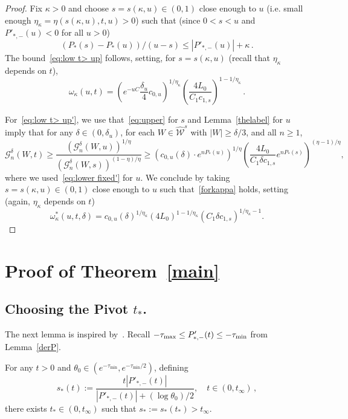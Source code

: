 \documentclass[AHL,Unicode,longabstracts,published]{cedram}
\newcommand{\cG}{\mathcal{G}}
\newcommand{\cW}{\mathcal{W}}
\newcommand{\hW}{\widehat{\cW}}
\begin{document}
\begin{proof}
Fix $\kappa>0$ and choose $s=s(\kappa,u)\in (0, 1)$ close enough to $u$ (i.e. small enough $\eta_\kappa = \eta(s(\kappa, u),t,u) >0$) such that (since $0<s<u$ and $ P'_{*,-}(u)<0$ for all $u>0$)
\begin{equation}\label{forkappa}
\left(P_*(s)-P_*(u)\right)/(u-s) \le \left| P'_{*,-}(u)\right| + \kappa\,.
\end{equation}
The bound~\eqref{eq:low t> up} follows, setting, for $s=s(\kappa,u)$ (recall that $\eta_\kappa$ depends on $t$),
\[
\omega_\kappa(u, t)=\left(e^{- u C} \frac{\delta_{u}}{4} c_{0,u} \right)^{1/{\eta_\kappa}}
\left ({ \frac{ 4 L_0 }{C_1 c_{1,s}} } \right)^{1-1/\eta_\kappa} \,.
\]


For~\eqref{eq:low t> up'}, we use that~\eqref{eq:upper} for $s$ and Lemma~\ref{thelabel} for $u$ imply that for any $\delta\in (0, \delta_{u})$, for each $W \in \hW^s$ with $|W| \ge \delta/3$, and all $n \ge 1$,
\begin{equation}\label{eq:interpol'}
\cG_n^\delta(W,t)
\ge \frac{\left(\cG_n^\delta(W,u)\right)^{1/\eta}}{\left(\cG_n^\delta(W,s)\right)^{(1-\eta)/\eta}}
\ge \left(c_{0,u}(\delta) \cdot e^{nP_*(u) }\right)^{1/\eta}
\left({ \frac{ 4 L_0 }{C_1 \delta c_{1,s}} } e^{nP_*(s)} \right)^{(\eta-1)/\eta},
\end{equation}
where we used~\eqref{eq:lower fixed'} for $u$. We conclude by taking $s=s(\kappa,u) \in (0, 1)$ close enough to $u$ such that~\eqref{forkappa} holds, setting (again, $\eta_\kappa$ depends on $t$)
\begin{equation*}
\omega_\kappa^*(u, t, \delta)=c_{0,u}(\delta)^{1/\eta_\kappa} ({ 4 L_0 })^{1-1/\eta_\kappa}\left(C_1 \delta c_{1,s}\right)^{1/\eta_\kappa-1}.
\end{equation*}
\end{proof}

\section{Proof of Theorem~\ref{main}}\label{44}
\subsection{Choosing the Pivot \texorpdfstring{$t_*$}{t*}.}\label{pivot}


The next lemma is inspired by~\cite[Definition~3.9]{BD2}. Recall $-\tau_{\max}\le P'_{*,-}(t)\linebreak\le -\tau_{\min}$ from Lemma~\ref{derP}.

\begin{lemm}\label{lem:t_*}
For any $t>0$ and $\theta_0\in (e^{- \tau_{\min}},e^{- \tau_{\min}/2})$, defining
\begin{equation}\label{s*}
s_*(t) := \frac{t \left|P'_{*,-}(t)\right|}{\left| P'_{*,-}(t)\right|+ (\log \theta_0)/2}, \quad t\in (0, t_\infty)\,,
\end{equation}
there exists $t_*\in (0,t_\infty)$ such that $s_*:=s_*(t_*)> t_\infty$.
\end{lemm}
\end{document}
